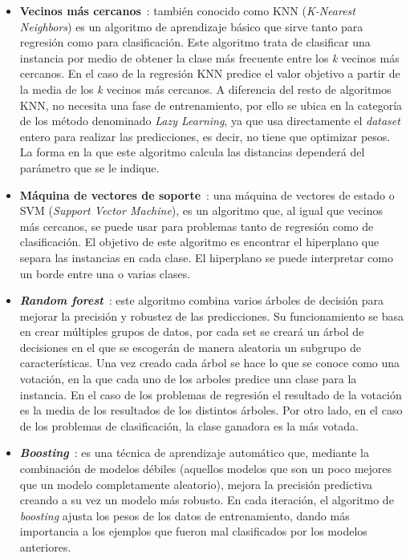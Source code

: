 \begin{itemize}
\item \textbf{Vecinos más cercanos}~\cite{KNN}: también conocido como KNN (\textit{K-Nearest Neighbors}) es un algoritmo de aprendizaje básico que sirve tanto para regresión como para clasificación. Este algoritmo trata de clasificar una instancia por medio de obtener la clase más frecuente entre los \textit{k} vecinos más cercanos. En el caso de la regresión KNN predice el valor objetivo a partir de la media de los \textit{k} vecinos más cercanos. A diferencia del resto de algoritmos KNN, no necesita una fase de entrenamiento, por ello se ubica en la categoría de los método denominado \textit{Lazy Learning}, ya que usa directamente el \textit{dataset} entero para realizar las predicciones, es decir, no tiene que optimizar pesos. La forma en la que este algoritmo calcula las distancias dependerá del parámetro que se le indique.

\item \textbf{Máquina de vectores de soporte}~\cite{SVM}: una máquina de vectores de estado o SVM (\textit{Support Vector Machine}), es un algoritmo que, al igual que vecinos más cercanos, se puede usar para problemas tanto de regresión como de clasificación. El objetivo de este algoritmo es encontrar el hiperplano que separa las instancias en cada clase. El hiperplano se puede interpretar como un borde entre una o varias clases. 
\item \textbf{\textit{Random forest}}~\cite{RF}: este algoritmo combina varios árboles de decisión para mejorar la precisión y robustez de las predicciones. Su funcionamiento se basa en crear múltiples grupos de datos, por cada set se creará un árbol de decisiones en el que se escogerán de manera aleatoria un subgrupo de características. Una vez creado cada árbol se hace lo que se conoce como una votación, en la que cada uno de los arboles predice una clase para la instancia. En el caso de los problemas de regresión el resultado de la votación es la media de los resultados de los distintos árboles. Por otro lado, en el caso de los problemas de clasificación, la clase ganadora es la más votada.

\item \textbf{\textit{Boosting}}~\cite{Boosting}: es una técnica de aprendizaje automático que, mediante la combinación de modelos débiles (aquellos modelos que son un poco mejores que un modelo completamente aleatorio), mejora la precisión predictiva creando a su vez un modelo más robusto. En cada iteración, el algoritmo de \textit{boosting} ajusta los pesos de los datos de entrenamiento, dando más importancia a los ejemplos que fueron mal clasificados por los modelos anteriores.


\end{itemize}
